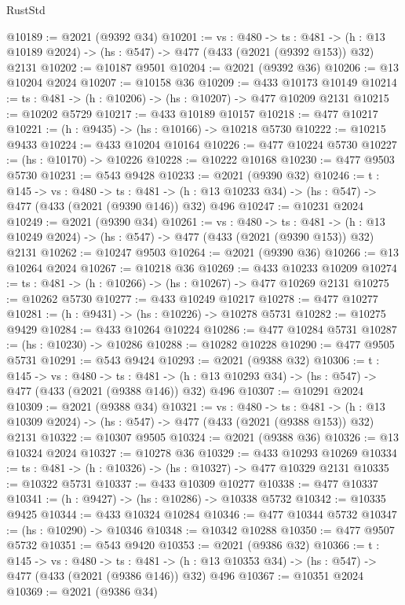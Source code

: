 \begin{lexlean}{RustStd}
\begin{coremodule}
@10189 := @2021 (@9392 @34)
@10201 := {vs : @480} ->
  {ts : @481} -> (h : @13 @10189 @2024) -> (hs : @547) -> @477 (@433 (@2021 (@9392 @153)) @32) @2131
@10202 := @10187 @9501
@10204 := @2021 (@9392 @36)
@10206 := @13 @10204 @2024
@10207 := @10158 @36
@10209 := @433 @10173 @10149
@10214 := {ts : @481} -> (h : @10206) -> (hs : @10207) -> @477 @10209 @2131
@10215 := @10202 @5729
@10217 := @433 @10189 @10157
@10218 := @477 @10217
@10221 := (h : @9435) -> (hs : @10166) -> @10218 @5730
@10222 := @10215 @9433
@10224 := @433 @10204 @10164
@10226 := @477 @10224 @5730
@10227 := (hs : @10170) -> @10226
@10228 := @10222 @10168
@10230 := @477 @9503 @5730
@10231 := @543 @9428
@10233 := @2021 (@9390 @32)
@10246 := {t : @145} ->
  {vs : @480} ->
  {ts : @481} -> (h : @13 @10233 @34) -> (hs : @547) -> @477 (@433 (@2021 (@9390 @146)) @32) @496
@10247 := @10231 @2024
@10249 := @2021 (@9390 @34)
@10261 := {vs : @480} ->
  {ts : @481} -> (h : @13 @10249 @2024) -> (hs : @547) -> @477 (@433 (@2021 (@9390 @153)) @32) @2131
@10262 := @10247 @9503
@10264 := @2021 (@9390 @36)
@10266 := @13 @10264 @2024
@10267 := @10218 @36
@10269 := @433 @10233 @10209
@10274 := {ts : @481} -> (h : @10266) -> (hs : @10267) -> @477 @10269 @2131
@10275 := @10262 @5730
@10277 := @433 @10249 @10217
@10278 := @477 @10277
@10281 := (h : @9431) -> (hs : @10226) -> @10278 @5731
@10282 := @10275 @9429
@10284 := @433 @10264 @10224
@10286 := @477 @10284 @5731
@10287 := (hs : @10230) -> @10286
@10288 := @10282 @10228
@10290 := @477 @9505 @5731
@10291 := @543 @9424
@10293 := @2021 (@9388 @32)
@10306 := {t : @145} ->
  {vs : @480} ->
  {ts : @481} -> (h : @13 @10293 @34) -> (hs : @547) -> @477 (@433 (@2021 (@9388 @146)) @32) @496
@10307 := @10291 @2024
@10309 := @2021 (@9388 @34)
@10321 := {vs : @480} ->
  {ts : @481} -> (h : @13 @10309 @2024) -> (hs : @547) -> @477 (@433 (@2021 (@9388 @153)) @32) @2131
@10322 := @10307 @9505
@10324 := @2021 (@9388 @36)
@10326 := @13 @10324 @2024
@10327 := @10278 @36
@10329 := @433 @10293 @10269
@10334 := {ts : @481} -> (h : @10326) -> (hs : @10327) -> @477 @10329 @2131
@10335 := @10322 @5731
@10337 := @433 @10309 @10277
@10338 := @477 @10337
@10341 := (h : @9427) -> (hs : @10286) -> @10338 @5732
@10342 := @10335 @9425
@10344 := @433 @10324 @10284
@10346 := @477 @10344 @5732
@10347 := (hs : @10290) -> @10346
@10348 := @10342 @10288
@10350 := @477 @9507 @5732
@10351 := @543 @9420
@10353 := @2021 (@9386 @32)
@10366 := {t : @145} ->
  {vs : @480} ->
  {ts : @481} -> (h : @13 @10353 @34) -> (hs : @547) -> @477 (@433 (@2021 (@9386 @146)) @32) @496
@10367 := @10351 @2024
@10369 := @2021 (@9386 @34)

\end{coremodule}
\end{lexlean}
